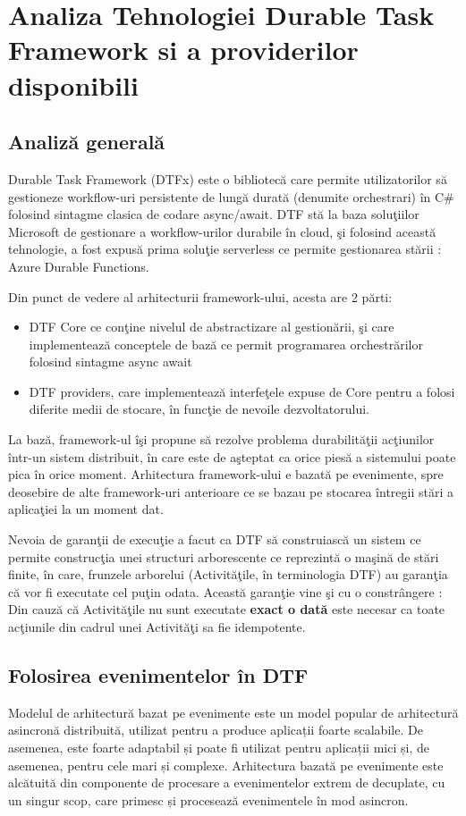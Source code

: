 \documentclass[a4paper,12pt]{report}
\begin{document}
\chapter{Analiza Tehnologiei Durable Task Framework si a providerilor disponibili}
\section{Analiză generală}
\quad Durable Task Framework (DTFx) este o bibliotecă care permite utilizatorilor să gestioneze workflow-uri persistente de lungă durată (denumite orchestrari) în C\# folosind sintagme clasica de codare async/await. DTF stă la baza soluţiilor Microsoft de gestionare a workflow-urilor durabile în cloud, şi folosind această tehnologie, a fost expusă prima soluţie serverless ce permite gestionarea stării : Azure Durable Functions. 
\par Din punct de vedere al arhitecturii framework-ului, acesta are 2 părti:
\begin{itemize} 
\item DTF Core ce conţine nivelul de abstractizare al gestionării, şi care implementează conceptele de bază ce permit programarea orchestrărilor folosind sintagme async await
\item DTF providers, care implementează interfeţele expuse de Core pentru a folosi diferite medii de stocare, în funcţie de nevoile dezvoltatorului. 
\end{itemize} 
\par La bază, framework-ul îşi propune să rezolve problema durabilităţii acţiunilor într-un sistem distribuit, în care este de aşteptat ca orice piesă a sistemului poate pica în orice moment. Arhitectura framework-ului e bazată pe evenimente, spre deosebire de alte framework-uri anterioare ce se bazau pe stocarea întregii stări a aplicaţiei la un moment dat. 
\par Nevoia de garanţii de execuţie a facut ca DTF să construiască un sistem ce permite construcţia unei structuri arborescente ce reprezintă o maşină de stări finite, în care, frunzele arborelui (Activităţile, în terminologia DTF) au garanţia că vor fi executate cel puţin odata. Această garanţie vine şi cu o constrângere : Din cauză că Activităţile nu sunt executate \textbf{exact o dată} este necesar ca toate acţiunile din cadrul unei Activităţi sa fie idempotente. 
\section{Folosirea evenimentelor în DTF}
\quad Modelul de arhitectură bazat pe evenimente este un model popular de arhitectură asincronă distribuită, utilizat pentru a produce aplicații foarte scalabile. De asemenea, este foarte adaptabil și poate fi utilizat pentru aplicații mici și, de asemenea, pentru cele mari și complexe. Arhitectura bazată pe evenimente este alcătuită din componente de procesare a evenimentelor extrem de decuplate, cu un singur scop, care primesc și procesează evenimentele în mod asincron.
\end{document}
